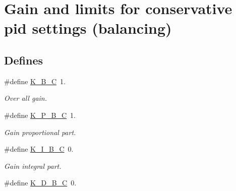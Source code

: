 \hypertarget{group___p_i_d___c_o_n_s_e_r_v_a_t_i_v_e}{\section{\-Gain and limits for conservative pid settings (balancing)}
\label{group___p_i_d___c_o_n_s_e_r_v_a_t_i_v_e}
}
\subsection*{\-Defines}
\begin{DoxyCompactItemize}
\item 
\hypertarget{group___p_i_d___c_o_n_s_e_r_v_a_t_i_v_e_gabd87ddda9a7835cbbdad494de1816966}{\#define \hyperlink{group___p_i_d___c_o_n_s_e_r_v_a_t_i_v_e_gabd87ddda9a7835cbbdad494de1816966}{\-K\-\_\-\-B\-\_\-\-C}~1.}\label{group___p_i_d___c_o_n_s_e_r_v_a_t_i_v_e_gabd87ddda9a7835cbbdad494de1816966}

\begin{DoxyCompactList}\small\item\em \-Over all gain. \end{DoxyCompactList}\item 
\hypertarget{group___p_i_d___c_o_n_s_e_r_v_a_t_i_v_e_ga6368ffc1b40771544abbef8a674b3cee}{\#define \hyperlink{group___p_i_d___c_o_n_s_e_r_v_a_t_i_v_e_ga6368ffc1b40771544abbef8a674b3cee}{\-K\-\_\-\-P\-\_\-\-B\-\_\-\-C}~1.}\label{group___p_i_d___c_o_n_s_e_r_v_a_t_i_v_e_ga6368ffc1b40771544abbef8a674b3cee}

\begin{DoxyCompactList}\small\item\em \-Gain proportional part. \end{DoxyCompactList}\item 
\hypertarget{group___p_i_d___c_o_n_s_e_r_v_a_t_i_v_e_ga487ba1a2fb1f6eb30ede520a377bef8d}{\#define \hyperlink{group___p_i_d___c_o_n_s_e_r_v_a_t_i_v_e_ga487ba1a2fb1f6eb30ede520a377bef8d}{\-K\-\_\-\-I\-\_\-\-B\-\_\-\-C}~0.}\label{group___p_i_d___c_o_n_s_e_r_v_a_t_i_v_e_ga487ba1a2fb1f6eb30ede520a377bef8d}

\begin{DoxyCompactList}\small\item\em \-Gain integral part. \end{DoxyCompactList}\item 
\hypertarget{group___p_i_d___c_o_n_s_e_r_v_a_t_i_v_e_gaa4a54318f792ea9e243345ae8d9788e8}{\#define \hyperlink{group___p_i_d___c_o_n_s_e_r_v_a_t_i_v_e_gaa4a54318f792ea9e243345ae8d9788e8}{\-K\-\_\-\-D\-\_\-\-B\-\_\-\-C}~0.}\label{group___p_i_d___c_o_n_s_e_r_v_a_t_i_v_e_gaa4a54318f792ea9e243345ae8d9788e8}


\end{DoxyCompactItemize}
